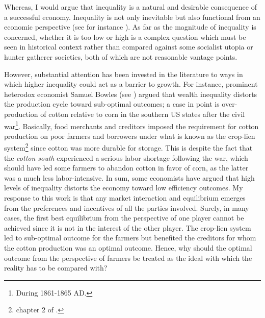 \documentclass[12pt]{article}
\newcommand{\1}{\mathbbm 1}
\begin{document}
	
	Whereas, I would argue that inequality is a natural and desirable consequence of a successful economy. Inequality is not only inevitable but also functional from an economic perspective (see for instance \cite{welch1999defense}). As far as the magnitude of inequality is concerned, whether it is too low or high is a complex question which must be seen in historical context rather than compared against some socialist utopia or hunter gatherer societies, both of which are not reasonable vantage points.	
	
	However, substantial attention has been invested in the literature to ways in which higher inequality could act as a barrier to growth. For instance, prominent heterodox economist Samuel Bowles (see \cite{bowles2012new}) argued that wealth inequality distorts the production cycle toward sub-optimal outcomes; a case in point is over-production of cotton relative to corn in the southern US states after the civil war\footnote{During 1861-1865 AD.}. Basically, food merchants and creditors imposed the requirement for cotton production on poor farmers and borrowers under what is known as the crop-lien system\footnote{chapter 2 of \cite{bowles2012new}.} since cotton was more durable for storage. This is despite the fact that the \textit{cotton south} experienced a serious labor shortage following the war, which should have led some farmers to abandon cotton in favor of corn, as the latter was a much less labor-intensive. In sum, some economists have argued that high levels of inequality distorts the economy toward low efficiency outcomes. My response to this work is that any market interaction and equilibrium emerges from the preferences and incentives of all the parties involved. Surely, in many cases, the first best equilibrium from the perspective of one player cannot be achieved since it is not in the interest of the other player. The crop-lien system led to sub-optimal outcome for the farmers but benefited the creditors for whom the cotton production was an optimal outcome. Hence, why should the optimal outcome from the perspective of farmers be treated as the ideal with which the reality has to be compared with? 
	
\end{document}
